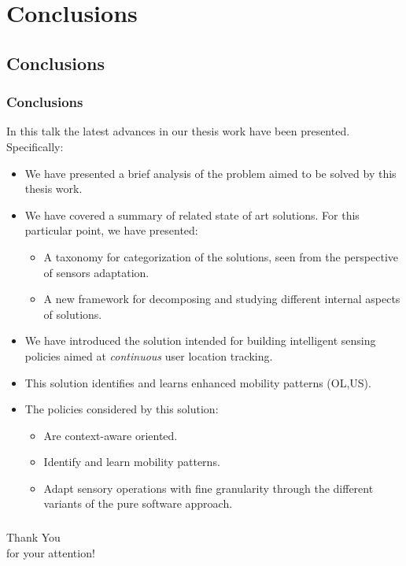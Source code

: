 \documentclass[compress,9pt,xcolor={dvipsnames,table}]{beamer}
\begin{document}
\section{Conclusions}
\subsection{Conclusions}
\begin{frame}\frametitle{Conclusions}
In this talk the latest advances in our thesis work have been presented.
Specifically:
\begin{itemize}
  \item We have presented a brief analysis of the problem aimed to be solved by this thesis work.
  \item We have covered a summary of related state of art solutions.
  For this particular point, we have presented:
  \begin{itemize}
    \item A taxonomy for categorization of the solutions, seen from the perspective of sensors adaptation.
    \item A new framework for decomposing and studying different internal aspects of solutions. 
  \end{itemize}
  \item We have introduced the solution intended for building intelligent sensing policies aimed at \emph{continuous} user location tracking.
  \item This solution identifies and learns enhanced mobility patterns (OL,US).
  \item The policies considered by this solution:
  \begin{itemize}
    \item Are context-aware oriented.
    \item Identify and learn mobility patterns.
    \item Adapt sensory operations with fine granularity through the different variants of the pure software approach.
  \end{itemize}
\end{itemize}
\end{frame}

\begin{frame}\frametitle{}
\begin{center}
{
\Huge
Thank You\\ for your attention!
}
\end{center}

\end{frame}
\end{document}
